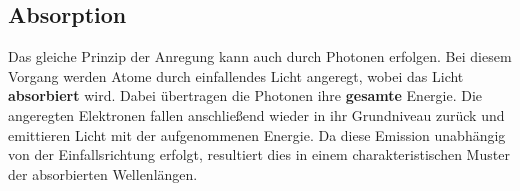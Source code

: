 \documentclass[a4paper,11pt]{article}
\begin{document}
\subsection{Absorption}
Das gleiche Prinzip der Anregung kann auch durch Photonen erfolgen. Bei diesem Vorgang werden Atome durch einfallendes Licht angeregt, wobei das Licht \textbf{absorbiert} wird. Dabei übertragen die Photonen ihre \textbf{gesamte} Energie. Die angeregten Elektronen fallen anschließend wieder in ihr Grundniveau zurück und emittieren Licht mit der aufgenommenen Energie. Da diese Emission unabhängig von der Einfallsrichtung erfolgt, resultiert dies in einem charakteristischen Muster der absorbierten Wellenlängen.
\end{document}
